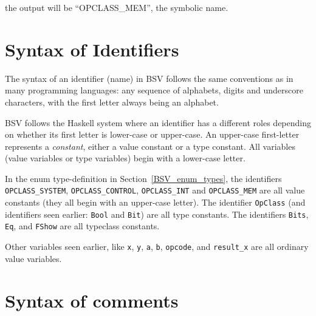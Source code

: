 the output will be ``OPCLASS\_MEM'', {\ie} the symbolic name.


\section{Syntax of Identifiers}

\label{BSV_Syntax_of_Identifiers}


The syntax of an identifier (name) in BSV follows the same conventions
as in many programming languages: any sequence of alphabets, digits
and underscore characters, with the first letter always being an
alphabet.


BSV follows the Haskell system where an identifier has a different
roles depending on whether its first letter is lower-case or
upper-case.  An upper-case first-letter represents a \emph{constant},
either a value constant or a type constant.  All variables (value
variables or type variables) begin with a lower-case letter.

In the enum type-definition in Section~\ref{BSV_enum_types}, the
identifiers \verb|OPCLASS_SYSTEM|, \verb|OPCLASS_CONTROL|,
\verb|OPCLASS_INT| and \verb|OPCLASS_MEM| are all value constants
(they all begin with an upper-case letter).  The identifier
\verb|OpClass| (and identifiers seen earlier: \verb|Bool| and
\verb|Bit|) are all type constants.  The identifiers \verb|Bits|,
\verb|Eq|, and \verb|FShow| are all typeclass constants.

Other variables seen earlier, like \verb|x|, \verb|y|, \verb|a|,
\verb|b|, \verb|opcode|, and \verb|result_x| are all ordinary value
variables.


\section{Syntax of comments}

\label{BSV_Syntax_of_comments}


